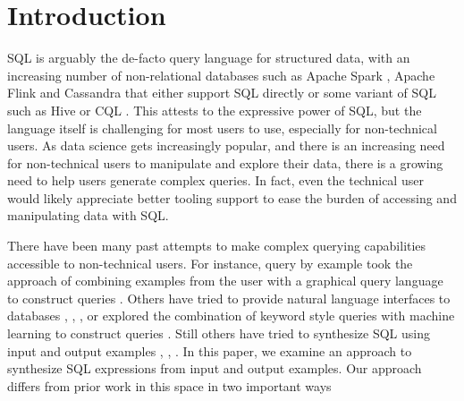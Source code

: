 \section{Introduction}

SQL is arguably the de-facto query language for structured data, with an increasing number of non-relational databases such as Apache Spark \cite{Apache_Spark}, Apache Flink \cite{Apache_Flink} and Cassandra \cite{Cassandra} that either support SQL directly or some variant of SQL such as Hive \cite{Hive} or CQL \cite{CQL}. This attests to the expressive power of SQL, but the language itself is challenging for most users to use, especially for non-technical users.  As data science gets increasingly popular, and there is an increasing need for non-technical users to manipulate and explore their data, there is a growing need to help users generate complex queries.  In fact, even the technical user would likely appreciate better tooling support to ease the burden of accessing and manipulating data with SQL.

There have been many past attempts to make complex querying capabilities accessible to non-technical users.  For instance, query by example took the approach of combining examples from the user with a graphical query language to construct queries \cite{Zloof}.  Others have tried to provide natural language interfaces to databases \cite{Fei-Li}, \cite{Androutsopoulos}, \cite{Seq2SQL}, or explored the combination of keyword style queries with machine learning to construct queries \cite{Bergamaschi}.  Still others have tried to synthesize SQL using input and output examples \cite{BodikPLDI}, \cite{BodikSIGMOD}, \cite{Zhang}.  In this paper, we examine an approach to synthesize SQL expressions from input and output examples.  Our approach differs from prior work in this space in two important ways


